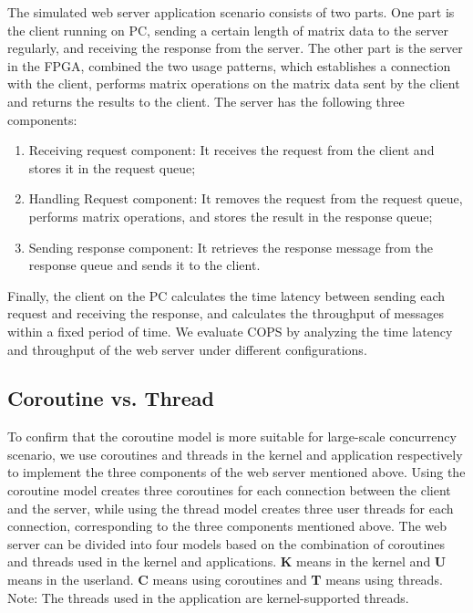 \documentclass[sigconf,review,anonymous]{acmart}
\begin{document}
The simulated web server application scenario consists of two parts. One part is the client running on PC, sending a certain length of matrix data to the server regularly, and receiving the response from the server. The other part is the server in the FPGA, combined the two usage patterns, which establishes a connection with the client, performs matrix operations on the matrix data sent by the client and returns the results to the client. The server has the following three components:

\begin{enumerate}[leftmargin=*]
    \item Receiving request component: It receives the request from the client and stores it in the request queue;
    \item Handling Request component: It removes the request from the request queue, performs matrix operations, and stores the result in the response queue;
    \item Sending response component: It retrieves the response message from the response queue and sends it to the client.
    
\end{enumerate}

Finally, the client on the PC calculates the time latency between sending each request and receiving the response, and calculates the throughput of messages within a fixed period of time. We evaluate COPS by analyzing the time latency and throughput of the web server under different configurations.

\subsection{Coroutine vs. Thread}

To confirm that the coroutine model is more suitable for large-scale concurrency scenario, we use coroutines and threads in the kernel and application respectively to implement the three components of the web server mentioned above. Using the coroutine model creates three coroutines for each connection between the client and the server, while using the thread model creates three user threads for each connection, corresponding to the three components mentioned above. The web server can be divided into four models based on the combination of coroutines and threads used in the kernel and applications. \textbf{K} means in the kernel and \textbf{U} means in the userland. \textbf{C} means using coroutines and \textbf{T} means using threads. Note: The threads used in the application are kernel-supported threads. 
\end{document}
